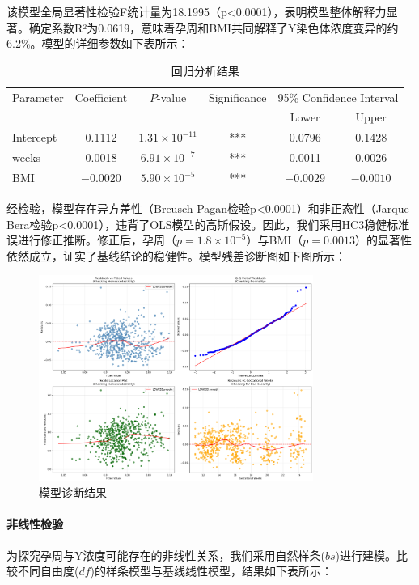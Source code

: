 \documentclass[withoutpreface]{cumcmthesis}
\begin{document}
该模型全局显著性检验F统计量为18.1995（p<0.0001），表明模型整体解释力显著。确定系数R²为0.0619，意味着孕周和BMI共同解释了Y染色体浓度变异的约6.2\%。模型的详细参数如下表所示：

\begin{table}[htbp]
\centering
\caption{回归分析结果}
\label{tab:regression_results}
\begin{tabular}{lccccc}
\toprule
Parameter & Coefficient & $P$-value & Significance & \multicolumn{2}{c}{95\% Confidence Interval} \\
\cmidrule(lr){5-6}
 &  &  &  & Lower & Upper \\
\midrule
Intercept & 0.1112 & $1.31 \times 10^{-11}$ & *** & 0.0796 & 0.1428 \\
weeks & 0.0018 & $6.91 \times 10^{-7}$ & *** & 0.0011 & 0.0026 \\
BMI & $-0.0020$ & $5.90 \times 10^{-5}$ & *** & $-0.0029$ & $-0.0010$ \\
\bottomrule
\end{tabular}
\end{table}

经检验，模型存在异方差性（Breusch-Pagan检验p<0.0001）和非正态性（Jarque-Bera检验p<0.0001），违背了OLS模型的高斯假设。因此，我们采用HC3稳健标准误进行修正推断。修正后，孕周（$p = 1.8 \times 10^{-5}$）与BMI（$p = 0.0013$）的显著性依然成立，证实了基线结论的稳健性。模型残差诊断图如下图所示：


\begin{figure}[htbp]
\centering
\includegraphics[width=0.8\textwidth]{output/figures/p1_model_diagnostics.png}
\caption{模型诊断结果}
\label{fig:model_diagnostics}
\end{figure}

\paragraph{非线性检验}
为探究孕周与Y浓度可能存在的非线性关系，我们采用自然样条($bs$)进行建模。比较不同自由度($df$)的样条模型与基线线性模型，结果如下表所示：
\end{document}
